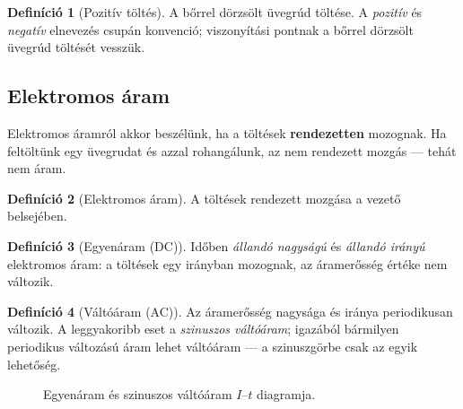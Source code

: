 \documentclass{article}
\theoremstyle{definition}
\newtheorem{definition}{Definíció}
\begin{document}
\begin{definition}[Pozitív töltés]
    A bőrrel dörzsölt üvegrúd töltése. A \emph{pozitív} és \emph{negatív}
    elnevezés csupán konvenció; viszonyítási pontnak a bőrrel dörzsölt üvegrúd
    töltését vesszük.
\end{definition}

\subsection{Elektromos áram}

Elektromos áramról akkor beszélünk, ha a töltések \textbf{rendezetten}
mozognak. Ha feltöltünk egy üvegrudat és azzal rohangálunk, az nem rendezett
mozgás — tehát nem áram.

\begin{definition}[Elektromos áram]
    A töltések rendezett mozgása a vezető belsejében.
\end{definition}

\begin{definition}[Egyenáram (DC)]
    Időben \emph{állandó nagyságú} és \emph{állandó irányú} elektromos áram:
    a töltések egy irányban mozognak, az áramerősség értéke nem változik.
\end{definition}

\begin{definition}[Váltóáram (AC)]
    Az áramerősség nagysága és iránya periodikusan változik. A leggyakoribb
    eset a \emph{szinuszos váltóáram}; igazából bármilyen periodikus
    változású áram lehet váltóáram — a szinuszgörbe csak az egyik lehetőség.
\end{definition}

\begin{figure}[h!]
\centering
{}
\hspace{0.8cm}
\caption{Egyenáram és szinuszos váltóáram $I$–$t$ diagramja.}
\end{figure}
\end{document}
